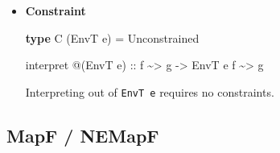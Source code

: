 \documentclass[]{article}
\newenvironment{Shaded}{}{}
\newcommand{\DataTypeTok}[1]{\textcolor[rgb]{0.56,0.13,0.00}{#1}}
\newcommand{\KeywordTok}[1]{\textcolor[rgb]{0.00,0.44,0.13}{\textbf{#1}}}
\newcommand{\NormalTok}[1]{#1}
\newcommand{\OperatorTok}[1]{\textcolor[rgb]{0.40,0.40,0.40}{#1}}
\newcommand{\OtherTok}[1]{\textcolor[rgb]{0.00,0.44,0.13}{#1}}
\begin{document}
\begin{itemize}
\item
  \textbf{Constraint}

\begin{Shaded}
\begin{Highlighting}[]
\KeywordTok{type} \DataTypeTok{C}\NormalTok{ (}\DataTypeTok{EnvT}\NormalTok{ e) }\OtherTok{=} \DataTypeTok{Unconstrained}

\NormalTok{interpret }\OperatorTok{@}\NormalTok{(}\DataTypeTok{EnvT}\NormalTok{ e)}
\OtherTok{    ::}\NormalTok{ f }\OperatorTok{\textasciitilde{}>}\NormalTok{ g}
    \OtherTok{{-}>} \DataTypeTok{EnvT}\NormalTok{ e f }\OperatorTok{\textasciitilde{}>}\NormalTok{ g}
\end{Highlighting}
\end{Shaded}

  Interpreting out of \texttt{EnvT\ e} requires no constraints.
\end{itemize}

\hypertarget{mapf-nemapf}{%
\subsection{MapF / NEMapF}\label{mapf-nemapf}}
\end{document}
